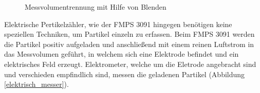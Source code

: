 \begin{figure}[H]
	\myfloatalign
	 \quad
	\caption[Messvolumentrennung mit Hilfe von Blenden\cite{reinraum}]
	{Messvolumentrennung mit Hilfe von Blenden\cite{reinraum}}
\end{figure}

Elektrische Pertikelz\"{a}hler, wie der FMPS 3091 hingegen ben\"{o}tigen keine speziellen Techniken, um Partikel einzeln zu erfassen. Beim FMPS 3091 werden die Partikel positiv aufgeladen und anschlie{\ss}end mit einem reinen Luftstrom in das Messvolumen gef\"{u}hrt, in welchem sich eine Elektrode befindet und ein elektrisches Feld erzeugt. Elektrometer, welche um die Eletrode angebracht sind und verschieden empfindlich sind, messen die geladenen Partikel (Abbildung \ref{elektrisch_messer}).


